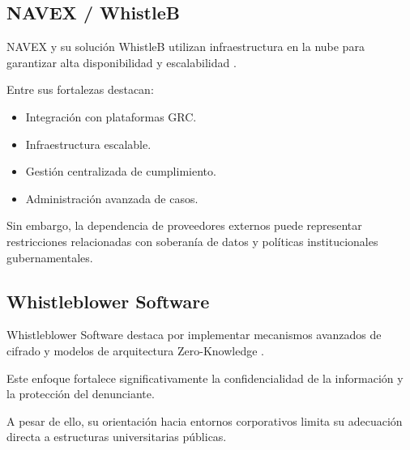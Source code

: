 \subsection{NAVEX / WhistleB}

\begin{flushleft}
\justifying

NAVEX y su solución WhistleB utilizan infraestructura en la nube para garantizar alta disponibilidad y escalabilidad \cite{17}.

Entre sus fortalezas destacan:

\begin{itemize}

    \item Integración con plataformas GRC.
    
    \item Infraestructura escalable.
    
    \item Gestión centralizada de cumplimiento.
    
    \item Administración avanzada de casos.

\end{itemize}

Sin embargo, la dependencia de proveedores externos puede representar restricciones relacionadas con soberanía de datos y políticas institucionales gubernamentales.

\end{flushleft}


\subsection{Whistleblower Software}

\begin{flushleft}
\justifying

Whistleblower Software destaca por implementar mecanismos avanzados de cifrado y modelos de arquitectura Zero-Knowledge \cite{18}.

Este enfoque fortalece significativamente la confidencialidad de la información y la protección del denunciante.

A pesar de ello, su orientación hacia entornos corporativos limita su adecuación directa a estructuras universitarias públicas.

\end{flushleft}

